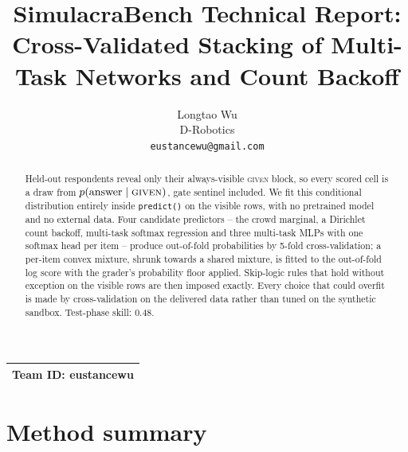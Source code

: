 \documentclass{article}
\title{SimulacraBench Technical Report:\\ Cross-Validated Stacking of Multi-Task Networks and Count Backoff}
\author{%
  Longtao Wu\\
  D-Robotics\\
  \texttt{eustancewu@gmail.com}
}
\newcommand{\teamid}{eustancewu}
\begin{document}
\maketitle

\begin{center}
\begin{tabular}{l}
\toprule
\textbf{Team ID:} \teamid \\
\bottomrule
\end{tabular}
\end{center}

\begin{abstract}
Held-out respondents reveal only their always-visible \textsc{given} block, so every scored cell is a draw from $p(\text{answer}\mid\textsc{given})$, gate sentinel included. We fit this conditional distribution entirely inside \texttt{predict()} on the visible rows, with no pretrained model and no external data. Four candidate predictors -- the crowd marginal, a Dirichlet count backoff, multi-task softmax regression and three multi-task MLPs with one softmax head per item -- produce out-of-fold probabilities by 5-fold cross-validation; a per-item convex mixture, shrunk towards a shared mixture, is fitted to the out-of-fold log score with the grader's probability floor applied. Skip-logic rules that hold without exception on the visible rows are then imposed exactly. Every choice that could overfit is made by cross-validation on the delivered data rather than tuned on the synthetic sandbox. Test-phase skill: 0.48.
\end{abstract}

\section{Method summary}
\label{sec:method}
\end{document}
